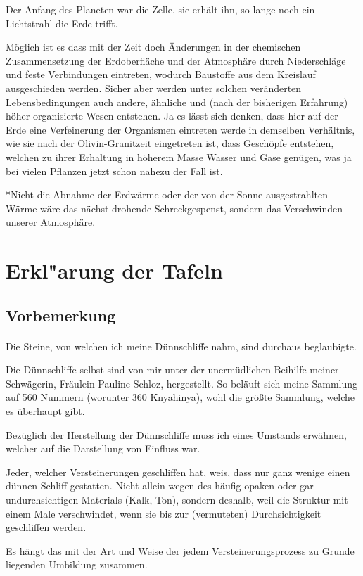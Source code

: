 \documentclass[a4paper, 12pt, oneside]{article}
\begin{document}
Der Anfang des Planeten war die Zelle, sie erhält ihn, so lange noch ein Lichtstrahl die Erde trifft.

Möglich ist es dass mit der Zeit doch Änderungen in der chemischen Zusammensetzung der Erdoberfläche und der Atmosphäre durch Niederschläge und feste Verbindungen eintreten, wodurch Baustoffe aus dem Kreislauf ausgeschieden werden. Sicher aber werden unter solchen veränderten Lebensbedingungen auch andere, ähnliche und (nach der bisherigen Erfahrung) höher organisierte Wesen entstehen. Ja es lässt sich denken, dass hier auf der Erde eine Verfeinerung der Organismen eintreten werde in demselben Verhältnis, wie sie nach der Olivin-Granitzeit eingetreten ist, dass Geschöpfe entstehen, welchen zu ihrer Erhaltung in höherem Masse Wasser und Gase genügen, was ja bei vielen Pflanzen jetzt schon nahezu der Fall ist.

*Nicht die Abnahme der Erdwärme oder der von der Sonne ausgestrahlten Wärme wäre das nächst drohende Schreckgespenst, sondern das Verschwinden unserer Atmosphäre.
\clearpage
\section{Erkl"arung der Tafeln}
\subsection{Vorbemerkung}
\paragraph{}
Die Steine, von welchen ich meine Dünnschliffe nahm, sind durchaus beglaubigte.

Die Dünnschliffe selbst sind von mir unter der unermüdlichen Beihilfe meiner Schwägerin, Fräulein Pauline Schloz, hergestellt. So beläuft sich meine Sammlung auf 560 Nummern (worunter 360 Knyahinya), wohl die größte Sammlung, welche es überhaupt gibt.

Bezüglich der Herstellung der Dünnschliffe muss ich eines Umstands erwähnen, welcher auf die Darstellung von Einfluss war.

Jeder, welcher Versteinerungen geschliffen hat, weis, dass nur ganz wenige einen dünnen Schliff gestatten. Nicht allein wegen des häufig opaken oder gar undurchsichtigen Materials (Kalk, Ton), sondern deshalb, weil die Struktur mit einem Male verschwindet, wenn sie bis zur (vermuteten) Durchsichtigkeit geschliffen werden.

Es hängt das mit der Art und Weise der jedem Versteinerungsprozess zu Grunde liegenden Umbildung zusammen.
\end{document}
